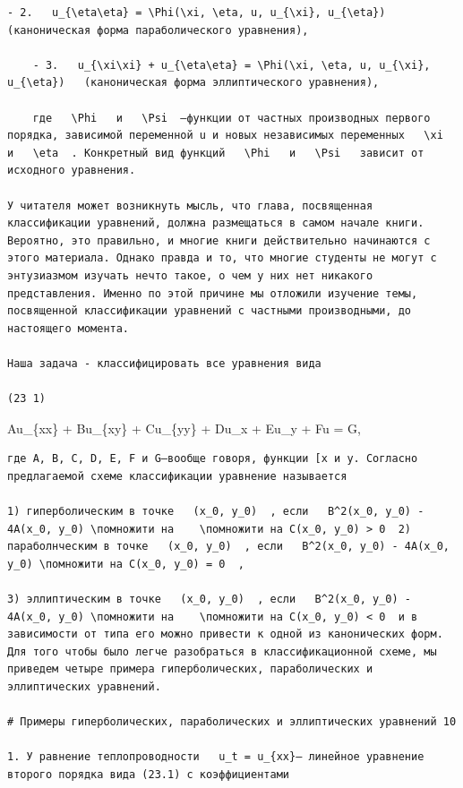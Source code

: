 \documentclass[
  ukrainian,
]{article}
\begin{document}
\begin{verbatim}
- 2.   u_{\eta\eta} = \Phi(\xi, \eta, u, u_{\xi}, u_{\eta}) (каноническая форма параболического уравнения),

    - 3.   u_{\xi\xi} + u_{\eta\eta} = \Phi(\xi, \eta, u, u_{\xi}, u_{\eta})   (каноническая форма эллиптического уравнения),

    где   \Phi   и   \Psi  —функции от частных производных первого порядка, зависимой переменной u и новых независимых переменных   \xi   и   \eta  . Конкретный вид функций   \Phi   и   \Psi   зависит от исходного уравнения.

У читателя может возникнуть мысль, что глава, посвященная классификации уравнений, должна размещаться в самом начале книги. Вероятно, это правильно, и многие книги действительно начинаются с этого материала. Однако правда и то, что многие студенты не могут с энтузиазмом изучать нечто такое, о чем у них нет никакого представления. Именно по этой причине мы отложили изучение темы, посвященной классификации уравнений с частными производными, до настоящего момента.

Наша задача - классифицировать все уравнения вида

(23 1)
\end{verbatim}

Au\_\{xx\} + Bu\_\{xy\} + Cu\_\{yy\} + Du\_x + Eu\_y + Fu = G,

\begin{verbatim}
где A, B, C, D, E, F и G—вообще говоря, функции [x и y. Согласно предлагаемой схеме классификации уравнение называется

1) гиперболическим в точке   (x_0, y_0)  , если   B^2(x_0, y_0) - 4A(x_0, y_0) \помножити на    \помножити на C(x_0, y_0) > 0  2) параболнческим в точке   (x_0, y_0)  , если   B^2(x_0, y_0) - 4A(x_0, y_0) \помножити на C(x_0, y_0) = 0  ,

3) эллиптическим в точке   (x_0, y_0)  , если   B^2(x_0, y_0) - 4A(x_0, y_0) \помножити на    \помножити на C(x_0, y_0) < 0  и в зависимости от типа его можно привести к одной из канонических форм. Для того чтобы было легче разобраться в классификационной схеме, мы приведем четыре примера гиперболических, параболических и эллиптических уравнений.

# Примеры гиперболических, параболических и эллиптических уравнений 10

1. У равнение теплопроводности   u_t = u_{xx}— линейное уравнение второго порядка вида (23.1) с коэффициентами
\end{verbatim}
\end{document}
